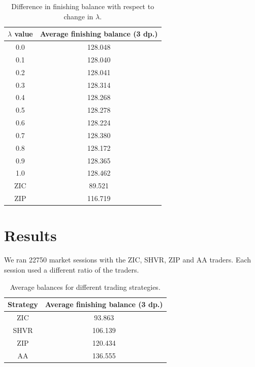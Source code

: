 \documentclass[preprint]{acm_proc_article-sp} %
\begin{document}
\begin{table}[h]
  \centering
  \label{tbl:lambda_results2}
  \begin{tabular}{ | c | c | }
    \hline
    \textbf{$\lambda$ value} & \textbf{Average finishing balance (3 dp.)} \\
    \hline
        0.0 & 128.048 \\
        0.1 & 128.040 \\
        0.2 & 128.041 \\
        0.3 & 128.314 \\
        0.4 & 128.268 \\
        0.5 & 128.278 \\
        0.6 & 128.224 \\
        0.7 & 128.380 \\
        0.8 & 128.172 \\
        0.9 & 128.365 \\
        1.0 & 128.462 \\
    \hline \hline
        ZIC &  89.521 \\
        ZIP & 116.719 \\
    \hline
  \end{tabular}
  \caption{Difference in finishing balance with respect to change in $\lambda$.}
\end{table}


\section{Results} \label{sec:results}

We ran 22750 market sessions with the ZIC, SHVR, ZIP and AA traders.
Each session used a different ratio of the traders.

\begin{table}[h]
  \centering
  \label{tbl:results}
  \begin{tabular}{ | c | c | }
    \hline
    Strategy & Average finishing balance (3 dp.) \\
    \hline
    ZIC & 93.863 \\
    SHVR & 106.139 \\
    ZIP & 120.434 \\
    AA & 136.555 \\
    \hline
  \end{tabular}
  \caption{Average balances for different trading strategies.}
\end{table}
\end{document}
